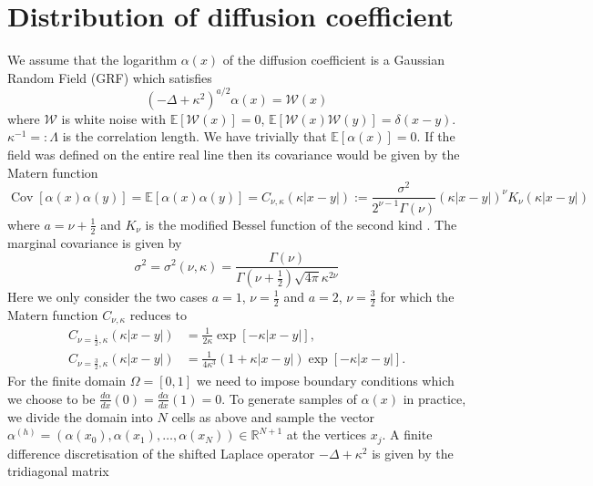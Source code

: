 \documentclass[11pt]{article}
\begin{document}
\section{Distribution of diffusion coefficient}
We assume that the logarithm $\alpha(x)$ of the diffusion coefficient is a Gaussian Random Field (GRF) which satisfies
\begin{equation}
    (-\Delta + \kappa^2)^{a/2}\alpha(x) = \mathcal{W}(x)
\end{equation}
where $\mathcal{W}$ is white noise with $\mathbb{E}[\mathcal{W}(x)]=0$, $\mathbb{E}[\mathcal{W}(x)\mathcal{W}(y)] = \delta(x-y)$. $\kappa^{-1}=:\Lambda$ is the correlation length. We have trivially that $\mathbb{E}[\alpha(x)]=0$. If the field was defined on the entire real line then its covariance would be given by the Matern function
\begin{equation}
    \operatorname{Cov}[\alpha(x)\alpha(y)]=\mathbb{E}[\alpha(x)\alpha(y)] = C_{\nu,\kappa}(\kappa |x-y|):=\frac{\sigma^2}{2^{\nu-1}\Gamma(\nu)}\left(\kappa |x-y|\right)^\nu K_\nu(\kappa|x-y|) 
\end{equation}
where $a = \nu+\frac{1}{2}$ and $K_\nu$ is the modified Bessel function of the second kind \cite{lindgren2011explicit}.
The marginal covariance is given by
\begin{equation}
    \sigma^2 = \sigma^2(\nu,\kappa) = \frac{\Gamma(\nu)}{\Gamma(\nu+\frac{1}{2})\sqrt{4\pi}\kappa^{2\nu}}
\end{equation}
Here we only consider the two cases $a=1$, $\nu=\frac{1}{2}$ and $a=2$, $\nu=\frac{3}{2}$ for which the Matern function $C_{\nu,\kappa}$ reduces to 
\begin{equation}
\begin{aligned}
        C_{\nu=\frac{1}{2},\kappa}(\kappa|x-y|) &= \frac{1}{2\kappa}\exp[-\kappa|x-y|],\\
        C_{\nu=\frac{3}{2},\kappa}(\kappa|x-y|) &= \frac{1}{4\kappa^3}\left(1+\kappa|x-y|\right)\exp[-\kappa|x-y|].
\end{aligned}
\end{equation}
For the finite domain $\Omega=[0,1]$ we need to impose boundary conditions which we choose to be $\frac{d\alpha}{dx}(0)=\frac{d\alpha}{dx}(1)=0$. To generate samples of $\alpha(x)$ in practice, we divide the domain into $N$ cells as above and sample the vector $\alpha^{(h)}=(\alpha(x_0),\alpha(x_1),\dots,\alpha(x_N))\in\mathbb{R}^{N+1}$ at the vertices $x_j$. A finite difference discretisation of the shifted Laplace operator $-\Delta + \kappa^2$ is given by the tridiagonal matrix
\end{document}
